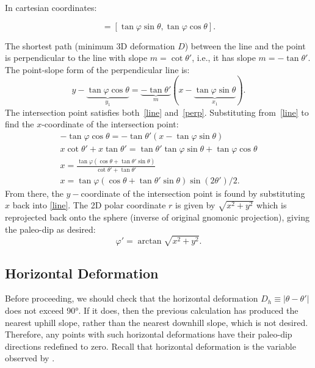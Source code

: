 In cartesian coordinates:

\begin{equation}
    [x,y]=[\tan\varphi\sin\theta,\tan\varphi\cos\theta].\label{point}
\end{equation}

The shortest path (minimum 3D deformation $D$) between the line and the point is perpendicular to the line with slope $m=\cot \theta'$, i.e., it has slope $m=-\tan \theta'$. The point-slope form of the perpendicular line is:
\begin{equation}
    y-\underbrace{\tan\varphi\cos\theta}_{y_1}=\underbrace{-\tan \theta'}_{m}(x-\underbrace{\tan\varphi\sin\theta}_{x_1}).\label{perp}
\end{equation}
The intersection point satisfies both~\ref{line} and~\ref{perp}. Substituting from~\ref{line} to find the $x$-coordinate of the intersection point: 
\begin{gather}
    [x\cot \theta']-\tan\varphi\cos\theta=-\tan \theta'(x-\tan\varphi\sin\theta)\nonumber\\
    x\cot \theta'+x\tan \theta'=\tan \theta'\tan\varphi\sin\theta+\tan\varphi\cos\theta\nonumber\\
    x=\frac{\tan\varphi(\cos\theta+\tan\theta'\sin\theta)}{\cot\theta'+\tan\theta'}\nonumber\\
    \boxed{x=\tan\varphi(\cos\theta+\tan\theta'\sin\theta)\sin(2\theta')/2.}\label{x}
\end{gather}
From there, the $y-$coordinate of the intersection point is found by substituting $x$ back into \eqref{line}. The 2D polar coordinate $r$ is given by $\sqrt{x^2+y^2}$ which is reprojected back onto the sphere (inverse of original gnomonic projection), giving the paleo-dip as desired:
\begin{equation}
    \varphi'=\arctan\sqrt{x^2+y^2}.
\end{equation}
\subsection{Horizontal Deformation}
Before proceeding, we should check that the horizontal deformation  $D_h \equiv |\theta-\theta'|$ does not exceed \ang{90}. If it does, then the previous calculation has produced the nearest uphill slope, rather than the nearest downhill slope, which is not desired. Therefore, any points with such horizontal deformations have their paleo-dip directions redefined to zero. Recall that horizontal deformation is the variable observed by \textcite{chadwick_late_2015,mouginis-mark_late-stage_2019}.
